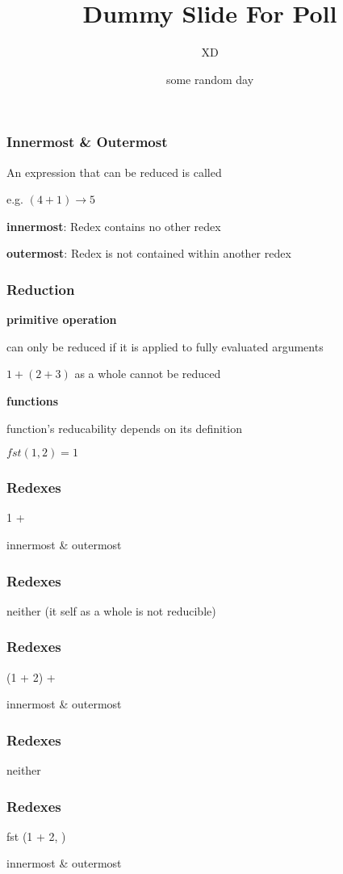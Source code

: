 \documentclass{beamer}
\title{Dummy Slide For Poll}
\author{XD}
\date{some random day}
\begin{document}
\frame{\titlepage}

\begin{frame}
    \frametitle{Innermost \& Outermost}
    An expression that can be reduced is called {\color{blue}{Redex}} 

    e.g. $(4 + 1) \rightarrow 5$

    \medskip
    \textbullet \textbf{innermost}:
    Redex contains no other redex

    \medskip
    \textbullet \textbf{outermost}:
    Redex is not contained within another redex

\end{frame}

\begin{frame}
    \frametitle{Reduction}
    \textbullet \textbf{primitive operation}

    can only be reduced if it is applied to fully evaluated arguments

    \smallskip
    $1 + (2 + 3)$ as a whole cannot be reduced

    \medskip
    \textbullet \textbf{functions}

    function's reducability depends on its definition

    \smallskip
    $fst (1,2) = 1$

\end{frame}

\begin{frame}
    \frametitle{Redexes}
    1 + {\color{red}{(2 * 3)}}

    \medskip
    innermost \& outermost
\end{frame}

\begin{frame}
    \frametitle{Redexes}
    {\color{red}{1 + (2 * 3)}}

    \medskip
    neither (it self as a whole is not reducible)
\end{frame}

\begin{frame}
    \frametitle{Redexes}
    (1 + 2) + {\color{red}{(2 + 3)}}

    \medskip
    innermost \& outermost
\end{frame}

\begin{frame}
    \frametitle{Redexes}
    {\color{red}{(1 + 2) * (2 + 3)}}

    \medskip
    neither
\end{frame}

\begin{frame}
    \frametitle{Redexes}
    fst (1 + 2, {\color{red}{2 + 3}})

    \medskip
    innermost \& outermost
\end{frame}
\end{document}
